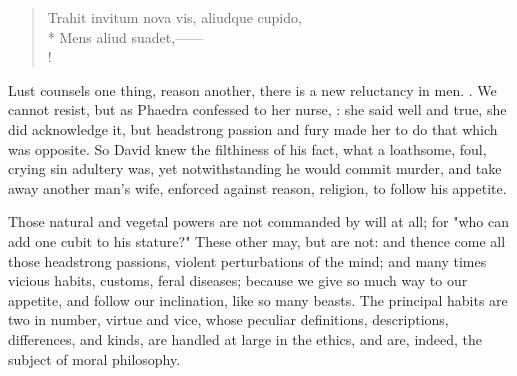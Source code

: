 \begin{latin}
\begin{verse}
Trahit invitum nova vis, aliudque cupido,\\*
Mens aliud suadet,------\\!
\end{verse}
\end{latin}

Lust counsels one thing, reason another, there is a new reluctancy in men.
. We
cannot resist, but as Phaedra confessed to her nurse,
: she said well and true, she did acknowledge it, but headstrong passion
and fury made her to do that which was opposite. So David knew the filthiness
of his fact, what a loathsome, foul, crying sin adultery was, yet
notwithstanding he would commit murder, and take away another man's wife,
enforced against reason, religion, to follow his appetite.

Those natural and vegetal powers are not commanded by will at all; for "who can
add one cubit to his stature?" These other may, but are not: and thence come
all those headstrong passions, violent perturbations of the mind; and many
times vicious habits, customs, feral diseases; because we give so much way to
our appetite, and follow our inclination, like so many beasts. The principal
habits are two in number, virtue and vice, whose peculiar definitions,
descriptions, differences, and kinds, are handled at large in the ethics, and
are, indeed, the subject of moral philosophy.

